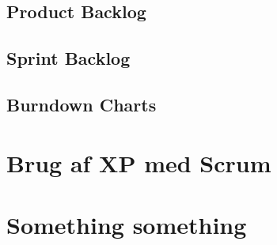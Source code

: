 \subsection{Product Backlog}


\subsection{Sprint Backlog}



\subsection{Burndown Charts}





\section{Brug af XP med Scrum}



\section{Something something}